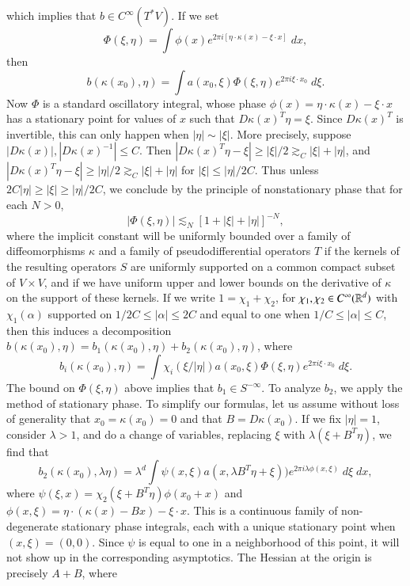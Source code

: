 %
which implies that $b \in C^\infty(T^* V)$. If we set
%
\[ \Phi(\xi,\eta) = \int \phi(x) e^{2 \pi i [ \eta \cdot \kappa(x) - \xi \cdot x ]}\; dx, \]
%
then
%
\[ b(\kappa(x_0), \eta) = \int a(x_0,\xi) \Phi(\xi,\eta) e^{2 \pi i \xi \cdot x_0}\; d\xi. \]
%
Now $\Phi$ is a standard oscillatory integral, whose phase $\phi(x) = \eta \cdot \kappa(x) - \xi \cdot x$ has a stationary point for values of $x$ such that $D\kappa(x)^T \eta = \xi$. Since $D\kappa(x)^T$ is invertible, this can only happen when $|\eta| \sim |\xi|$. More precisely, suppose $|D\kappa(x)|, |D\kappa(x)^{-1}| \leq C$. Then $|D\kappa(x)^T \eta - \xi| \geq |\xi|/2 \gtrsim_C |\xi| + |\eta|$, and $|D\kappa(x)^T \eta - \xi| \geq |\eta|/2 \gtrsim_C |\xi| + |\eta|$ for $|\xi| \leq |\eta|/2C$. Thus unless $2C|\eta| \geq |\xi| \geq |\eta|/2C$, we conclude by the principle of nonstationary phase that for each $N > 0$,
%
\[ |\Phi(\xi,\eta)| \lesssim_N [1 + |\xi| + |\eta|]^{-N}, \]
%
where the implicit constant will be uniformly bounded over a family of diffeomorphisms $\kappa$ and a family of pseudodifferential operators $T$ if the kernels of the resulting operators $S$ are uniformly supported on a common compact subset of $V \times V$, and if we have uniform upper and lower bounds on the derivative of $\kappa$ on the support of these kernels. If we write $1 = \chi_1 + \chi_2$, for $\chi_1,\chi_2 \in C^\infty(\operatorname{\mathbb{R}}^d)$ with $\chi_1(\alpha)$ supported on $1/2C \leq |\alpha| \leq 2C$ and equal to one when $1/C \leq |\alpha| \leq C$, then this induces a decomposition $b(\kappa(x_0),\eta) = b_1(\kappa(x_0),\eta) + b_2(\kappa(x_0),\eta)$, where
%
\[ b_i(\kappa(x_0),\eta) = \int \chi_i(\xi/|\eta|) a(x_0,\xi) \Phi(\xi,\eta) e^{2 \pi i \xi \cdot x_0}\; d\xi. \]
%
The bound on $\Phi(\xi,\eta)$ above implies that $b_1 \in S^{-\infty}$. To analyze $b_2$, we apply the method of stationary phase. To simplify our formulas, let us assume without loss of generality that $x_0 = \kappa(x_0) = 0$ and that $B = D\kappa(x_0)$. If we fix $|\eta| = 1$, consider $\lambda > 1$, and do a change of variables, replacing $\xi$ with $\lambda (\xi + B^T \eta)$, we find that
%
\[ b_2(\kappa(x_0),\lambda \eta) = \lambda^d \int \psi(x,\xi) a(x,\lambda B^T \eta + \xi)) e^{2 \pi i \lambda \phi(x,\xi)}\; d\xi\; dx, \]
%
where $\psi(\xi,x) = \chi_2(\xi + B^T \eta) \phi(x_0 + x)$ and $\phi(x,\xi) = \eta \cdot (\kappa(x) - Bx) - \xi \cdot x$. This is a continuous family of non-degenerate stationary phase integrals, each with a unique stationary point when $(x,\xi) = (0,0)$. Since $\psi$ is equal to one in a neighborhood of this point, it will not show up in the corresponding asymptotics. The Hessian at the origin is precisely $A + B$, where
